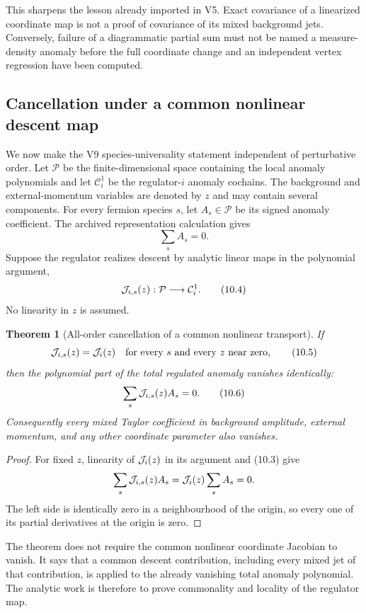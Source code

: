 \documentclass[11pt]{article}
\newtheorem{theorem}{Theorem}[section]
\theoremstyle{remark}
\begin{document}
This sharpens the lesson already imported in V5.  Exact covariance
of a linearized coordinate map is not a proof of covariance of its
mixed background jets.  Conversely, failure of a diagrammatic
partial sum must not be named a measure-density anomaly before the
full coordinate change and an independent vertex regression have
been computed.

\subsection{Cancellation under a common nonlinear descent map}

We now make the V9 species-universality statement independent of
perturbative order.  Let \(\mathcal P\) be the finite-dimensional
space containing the local anomaly polynomials and let
\(\mathcal C_i^1\) be the regulator-\(i\) anomaly cochains.  The
background and external-momentum variables are denoted by \(z\) and
may contain several components.  For every fermion species \(s\),
let \(A_s\in\mathcal P\) be its signed anomaly coefficient.  The
archived representation calculation gives
\[
                         \sum_s A_s=0.                       \tag{10.3}
\]
Suppose the regulator realizes descent by analytic linear maps in
the polynomial argument,
\[
 {\cal J}_{i,s}(z):\mathcal P\longrightarrow\mathcal C_i^1.
                                                               \tag{10.4}
\]
No linearity in \(z\) is assumed.

\begin{theorem}[All-order cancellation of a common nonlinear
transport]
\label{thm:v12v10-common}
If
\[
 {\cal J}_{i,s}(z)={\cal J}_i(z)
 \quad\hbox{for every \(s\) and every \(z\) near zero},       \tag{10.5}
\]
then the polynomial part of the total regulated anomaly vanishes
identically:
\[
             \sum_s{\cal J}_{i,s}(z)A_s=0.                  \tag{10.6}
\]
Consequently every mixed Taylor coefficient in background amplitude,
external momentum, and any other coordinate parameter also
vanishes.
\end{theorem}

\begin{proof}
For fixed \(z\), linearity of \({\cal J}_i(z)\) in its argument and
(10.3) give
\[
 \sum_s{\cal J}_{i,s}(z)A_s
 ={\cal J}_i(z)\sum_s A_s=0.
\]
The left side is identically zero in a neighbourhood of the origin,
so every one of its partial derivatives at the origin is zero.
\end{proof}

The theorem does not require the common nonlinear coordinate
Jacobian to vanish.  It says that a common descent contribution,
including every mixed jet of that contribution, is applied to the
already vanishing total anomaly polynomial.  The analytic work is
therefore to prove commonality and locality of the regulator map.
\end{document}

